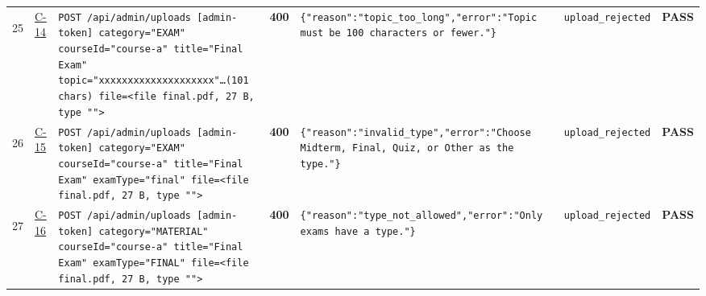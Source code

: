 \documentclass[10pt,a4paper]{article}
\begin{document}
\begin{landscape}
\begin{longtable}{@{}P{0.6cm}P{0.9cm}P{8.5cm}P{1.0cm}P{6.2cm}P{4.2cm}P{1.1cm}@{}}
\hypertarget{call25}{25} & \hyperlink{test-C-14}{C-14} & \texttt{POST /\allowbreak{}api/\allowbreak{}admin/\allowbreak{}uploads [admin-\allowbreak{}token] category=\allowbreak{}"\allowbreak{}EXAM"\allowbreak{} courseId=\allowbreak{}"\allowbreak{}course-\allowbreak{}a"\allowbreak{} title=\allowbreak{}"\allowbreak{}Final Exam"\allowbreak{} topic=\allowbreak{}"\allowbreak{}xxxxxxxxxxxxxxxxxx\allowbreak{}xx"\allowbreak{}…(101 chars) file=\allowbreak{}<file final.\allowbreak{}pdf,\allowbreak{} 27 B,\allowbreak{} type "\allowbreak{}"\allowbreak{}>} & \textcolor{warnamber}{\textbf{400}} & \texttt{\{"\allowbreak{}reason"\allowbreak{}:\allowbreak{}"\allowbreak{}topic\_\allowbreak{}too\_\allowbreak{}long"\allowbreak{},\allowbreak{}"\allowbreak{}error"\allowbreak{}:\allowbreak{}"\allowbreak{}Topic must be 100 characters or fewer.\allowbreak{}"\allowbreak{}\}} & \texttt{upload\_\allowbreak{}rejected} & \textcolor{passgreen}{\textbf{PASS}} \\
\hypertarget{call26}{26} & \hyperlink{test-C-15}{C-15} & \texttt{POST /\allowbreak{}api/\allowbreak{}admin/\allowbreak{}uploads [admin-\allowbreak{}token] category=\allowbreak{}"\allowbreak{}EXAM"\allowbreak{} courseId=\allowbreak{}"\allowbreak{}course-\allowbreak{}a"\allowbreak{} title=\allowbreak{}"\allowbreak{}Final Exam"\allowbreak{} examType=\allowbreak{}"\allowbreak{}final"\allowbreak{} file=\allowbreak{}<file final.\allowbreak{}pdf,\allowbreak{} 27 B,\allowbreak{} type "\allowbreak{}"\allowbreak{}>} & \textcolor{warnamber}{\textbf{400}} & \texttt{\{"\allowbreak{}reason"\allowbreak{}:\allowbreak{}"\allowbreak{}invalid\_\allowbreak{}type"\allowbreak{},\allowbreak{}"\allowbreak{}error"\allowbreak{}:\allowbreak{}"\allowbreak{}Choose Midterm,\allowbreak{} Final,\allowbreak{} Quiz,\allowbreak{} or Other as the type.\allowbreak{}"\allowbreak{}\}} & \texttt{upload\_\allowbreak{}rejected} & \textcolor{passgreen}{\textbf{PASS}} \\
\hypertarget{call27}{27} & \hyperlink{test-C-16}{C-16} & \texttt{POST /\allowbreak{}api/\allowbreak{}admin/\allowbreak{}uploads [admin-\allowbreak{}token] category=\allowbreak{}"\allowbreak{}MATERIAL"\allowbreak{} courseId=\allowbreak{}"\allowbreak{}course-\allowbreak{}a"\allowbreak{} title=\allowbreak{}"\allowbreak{}Final Exam"\allowbreak{} examType=\allowbreak{}"\allowbreak{}FINAL"\allowbreak{} file=\allowbreak{}<file final.\allowbreak{}pdf,\allowbreak{} 27 B,\allowbreak{} type "\allowbreak{}"\allowbreak{}>} & \textcolor{warnamber}{\textbf{400}} & \texttt{\{"\allowbreak{}reason"\allowbreak{}:\allowbreak{}"\allowbreak{}type\_\allowbreak{}not\_\allowbreak{}allowed"\allowbreak{},\allowbreak{}"\allowbreak{}error"\allowbreak{}:\allowbreak{}"\allowbreak{}Only exams have a type.\allowbreak{}"\allowbreak{}\}} & \texttt{upload\_\allowbreak{}rejected} & \textcolor{passgreen}{\textbf{PASS}} \\

\end{longtable}
\end{landscape}
\end{document}
